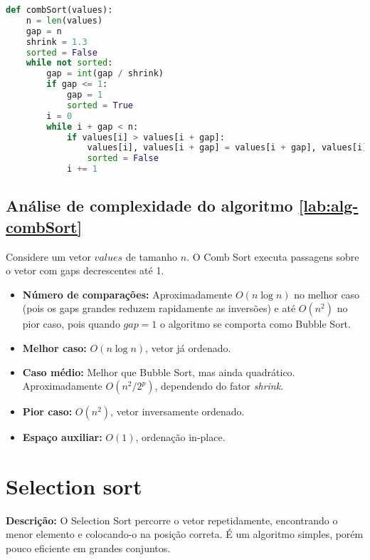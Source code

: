 \begin{lstlisting}[language=python,caption={Comb sort em Python},captionpos=t]
def combSort(values):
    n = len(values)
    gap = n
    shrink = 1.3
    sorted = False
    while not sorted:
        gap = int(gap / shrink)
        if gap <= 1:
            gap = 1
            sorted = True
        i = 0
        while i + gap < n:
            if values[i] > values[i + gap]:
                values[i], values[i + gap] = values[i + gap], values[i]
                sorted = False
            i += 1
\end{lstlisting}

\subsection{Análise de complexidade do algoritmo \ref{lab:alg-combSort}}
Considere um vetor $values$ de tamanho $n$. O Comb Sort executa passagens sobre o vetor com gaps decrescentes até 1.

\begin{itemize}
    \item \textbf{Número de comparações:}  
    Aproximadamente $O(n \log n)$ no melhor caso (pois os gaps grandes reduzem rapidamente as inversões) e até $O(n^2)$ no pior caso, pois quando $gap=1$ o algoritmo se comporta como Bubble Sort.
    
    \item \textbf{Melhor caso:} $O(n \log n)$, vetor já ordenado.
    \item \textbf{Caso médio:} Melhor que Bubble Sort, mas ainda quadrático. Aproximadamente $O(n^2 / 2^p)$, dependendo do fator \textit{shrink}.
    \item \textbf{Pior caso:} $O(n^2)$, vetor inversamente ordenado.
    \item \textbf{Espaço auxiliar:} $O(1)$, ordenação in-place.
\end{itemize}

\section{Selection sort}
\textbf{Descrição:} O Selection Sort percorre o vetor repetidamente, encontrando o menor elemento e colocando-o na posição correta. É um algoritmo simples, porém pouco eficiente em grandes conjuntos.

